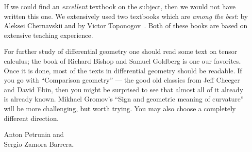 If we could find an \emph{excellent} textbook on the subject, then we would not have written this one.
We extensively used two textbooks which are \emph{among the best}: by Aleksei Chernavskii \cite{chernavsky} and by Victor Toponogov~\cite{toponogov-book}.
Both of these books are based on extensive teaching experience.

For further study of differential geometry one should read some text on tensor calculus; the book of Richard Bishop and Samuel Goldberg \cite{bishop-goldberg} is one our favorites.
Once it is done, most of the texts in differential geometry should be readable. 
If you go with  ``Comparison geometry'' \cite{cheeger-ebin} --- the good old classics from Jeff Cheeger and David Ebin, then you might be surprised to see that almost all of it already is already known.
Mikhael Gromov's ``Sign and geometric meaning of curvature'' \cite{gromov-1991} will be more challenging, but worth trying.
You may also choose a completely different direction.

\begin{flushright}
Anton Petrunin and\\
Sergio Zamora Barrera.
\end{flushright}



\newpage
\tableofcontents
